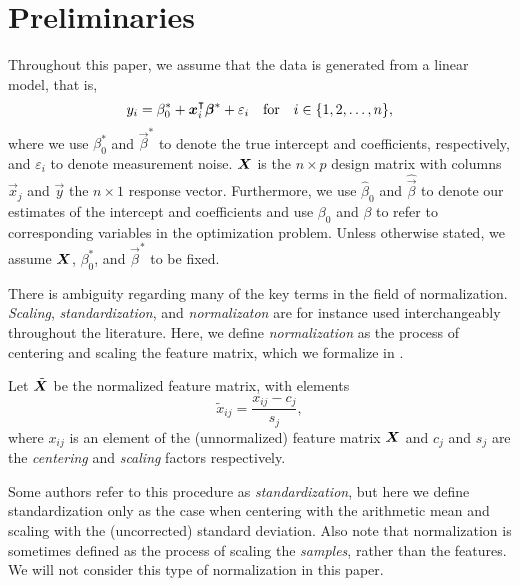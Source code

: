 \section{Preliminaries}

Throughout this paper, we assume that the data is generated from a linear model, that is,
\[
  y_i = \beta_0^* + \boldsymbol x_i^\intercal \boldsymbol\beta^* + \varepsilon_i \quad\text{for}\quad i \in \{1, 2, \dots, n\},
\]
where we use \(\beta_0^*\) and \(\vec\beta^*\) to denote the true intercept and coefficients, respectively, and \(\varepsilon_i\) to denote measurement noise. \(\boldsymbol X\) is the \(n \times p\) design matrix with columns \(\vec x_j\) and \(\vec y\) the \(n \times 1\) response vector.
Furthermore, we use \(\hat\beta_0\) and \(\hat{\vec{\beta}}\) to denote our estimates of the intercept and coefficients and use \(\beta_0\) and \(\beta\) to refer to corresponding variables in the optimization problem.
Unless otherwise stated, we assume \(\boldsymbol{X}\), \(\beta_0^*\), and \(\vec{\beta}^*\) to be fixed.

There is ambiguity regarding many of the key terms in the field of normalization. \emph{Scaling}, \emph{standardization}, and \emph{normalizaton} are for instance used interchangeably throughout the literature. Here, we define \emph{normalization} as the process of centering and scaling the feature matrix, which we formalize in .

\begin{definition}[Normalization]
  \label{def:normalization}
  Let \(\tilde{\boldsymbol X}\) be the normalized feature matrix, with
  elements
  \[
    \tilde{x}_{ij} = \frac{x_{ij} - c_{j}}{s_j},
  \]
  where \(x_{ij}\) is an element of the (unnormalized) feature matrix \(\boldsymbol{X}\)
  and \(c_j\) and \(s_j\) are the \emph{centering} and \emph{scaling} factors respectively.
\end{definition}

Some authors refer to this procedure as \emph{standardization}, but here we define standardization only as the case when centering with the arithmetic mean and scaling with the (uncorrected) standard deviation. Also note that normalization is sometimes defined as the process of scaling the \emph{samples}, rather than the features. We will not consider this type of normalization in this paper.

